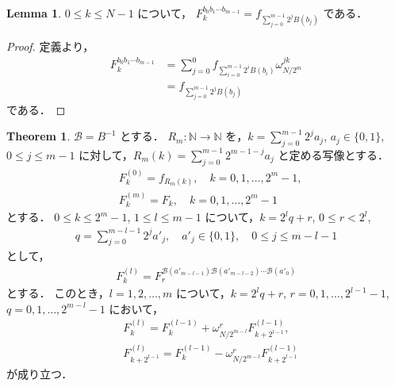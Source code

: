 \documentclass[twocolumn, uplatex, dvipdfmx]{jsarticle}
\renewcommand{\le}{\leqslant}
\numberwithin{equation}{section}
\theoremstyle{definition}
\newtheorem{thm}{Theorem}[section]
\newtheorem{lem}{Lemma}[section]
\begin{document}
\begin{lem}
	$0\le k\le N-1$ について，
	$F_k^{b_0b_1\cdots b_{m-1}}=f_{\sum_{j=0}^{m-1}2^jB(b_j)}$ である．
\end{lem}
\begin{proof}
	定義より，
	\begin{align*}
		F_k^{b_0b_1\cdots b_{m-1}}&=\sum_{j=0}^0f_{\sum_{i=0}^{m-1}2^iB(b_i)}\omega_{N/2^m}^{jk}\\
		&=f_{\sum_{j=0}^{m-1}2^jB(b_j)}
	\end{align*}
	である．
\end{proof}

\begin{thm}
	$\mathcal{B}=B^{-1}$ とする．
	$R_m:\mathbb{N}\to\mathbb{N}$ を，$k=\sum_{j=0}^{m-1}2^ja_j$, $a_j\in\{0,1\}$, $0\le j\le m-1$ に対して，$R_m(k)=\sum_{j=0}^{m-1}2^{m-1-j}a_j$ と定める写像とする．
	\begin{align}
		&F_k^{(0)}=f_{R_m(k)},\quad k=0,1,\dots,2^m-1,\\
		&F_k^{(m)}=F_k,\quad k=0,1,\dots,2^m-1
	\end{align}
	とする．
	$0\le k\le 2^m-1$, $1\le l\le m-1$ について，$k=2^lq+r$, $0\le r<2^l$,
	\begin{align}
		q=\sum_{j=0}^{m-l-1}2^ja'_j,\quad a'_j\in\{0,1\},\quad 0\le j\le m-l-1
	\end{align}
	として，
	\begin{align}
		F_k^{(l)}=F_r^{\mathcal{B}(a'_{m-l-1})\mathcal{B}(a'_{m-l-2})\cdots\mathcal{B}(a'_0)}
	\end{align}
	とする．
	このとき，$l=1,2,\dots,m$ について，$k=2^lq+r$, $r=0,1,\dots,2^{l-1}-1$, $q=0,1,\dots,2^{m-l}-1$ において，
	\begin{align}
		&F_k^{(l)}=F_k^{(l-1)}+\omega_{N/2^{m-l}}^rF_{k+2^{l-1}}^{(l-1)},\\
		&F_{k+2^{l-1}}^{(l)}=F_k^{(l-1)}-\omega_{N/2^{m-l}}^rF_{k+2^{l-1}}^{(l-1)}
	\end{align}
	が成り立つ．
\end{thm}
\end{document}
